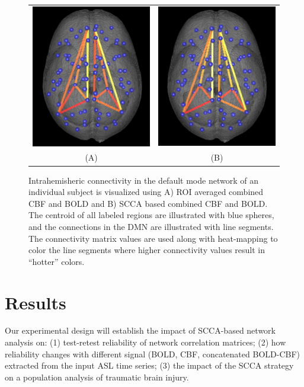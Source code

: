 \documentclass{llncs}
\begin{document}
\begin{figure}[tb]
\begin{center}
\begin{tabular}{ c c }
\includegraphics[width=0.30\linewidth]{roi.png} & \includegraphics[width=0.30\linewidth]{scca.png} \\
(A) & (B)
\end{tabular}
\caption{ Intrahemisheric connectivity in the default mode network of an individual subject is visualized using A) ROI averaged combined CBF and BOLD and B) SCCA based combined CBF and BOLD. The centroid of all labeled regions are illustrated with blue spheres, and the connections in the DMN are illustrated with line segments. The connectivity matrix values are used along with heat-mapping to color the line segments where higher connectivity values result in ``hotter'' colors. }
\label{fig:dmn}
\end{center}
\end{figure}


\section{Results}
Our experimental design will establish the impact of SCCA-based network analysis on: (1) test-retest reliability of network correlation matrices; (2) how reliability changes with different signal (BOLD, CBF, concatenated BOLD-CBF) extracted from the input ASL time series;  (3) the impact of the SCCA strategy on a population analysis of traumatic brain injury.  
\end{document}
